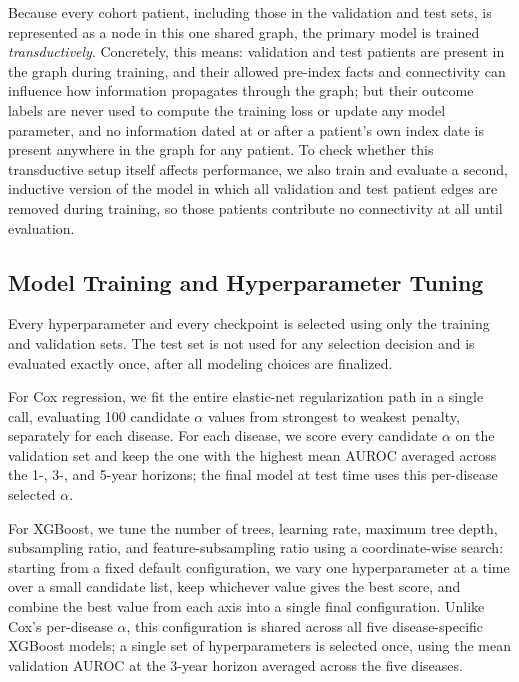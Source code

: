 Because every cohort patient, including those in the validation and test sets, is represented as a node in this one shared graph, the primary model is trained \emph{transductively}. Concretely, this means: validation and test patients are present in the graph during training, and their allowed pre-index facts and connectivity can influence how information propagates through the graph; but their outcome labels are never used to compute the training loss or update any model parameter, and no information dated at or after a patient's own index date is present anywhere in the graph for any patient. To check whether this transductive setup itself affects performance, we also train and evaluate a second, inductive version of the model in which all validation and test patient edges are removed during training, so those patients contribute no connectivity at all until evaluation.

\subsection{Model Training and Hyperparameter Tuning}
\label{sec:tuning}

Every hyperparameter and every checkpoint is selected using only the training and validation sets. The test set is not used for any selection decision and is evaluated exactly once, after all modeling choices are finalized.

For Cox regression, we fit the entire elastic-net regularization path in a single call, evaluating 100 candidate $\alpha$ values from strongest to weakest penalty, separately for each disease. For each disease, we score every candidate $\alpha$ on the validation set and keep the one with the highest mean AUROC averaged across the 1-, 3-, and 5-year horizons; the final model at test time uses this per-disease selected $\alpha$.

For XGBoost, we tune the number of trees, learning rate, maximum tree depth, subsampling ratio, and feature-subsampling ratio using a coordinate-wise search: starting from a fixed default configuration, we vary one hyperparameter at a time over a small candidate list, keep whichever value gives the best score, and combine the best value from each axis into a single final configuration. Unlike Cox's per-disease $\alpha$, this configuration is shared across all five disease-specific XGBoost models; a single set of hyperparameters is selected once, using the mean validation AUROC at the 3-year horizon averaged across the five diseases.

